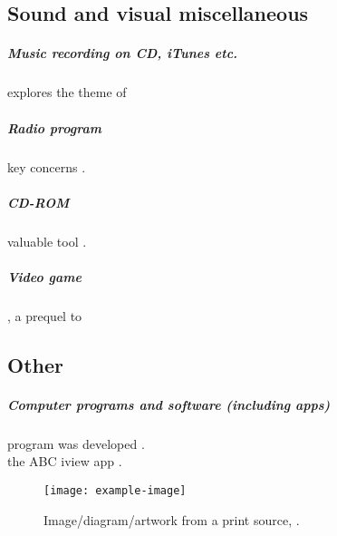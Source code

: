 \documentclass[a4paper,australian,oneside,12pt,footlines=3]{scrbook}%
\theoremstyle{remark}
\begin{document}
\begin{refsection}
\section{Sound and visual miscellaneous}
\paragraph{Music recording on CD, iTunes etc.}
\textcite{Palmer2011} explores the theme of\textelp{}

\paragraph{Radio program}
\textelp{}key concerns \parencite{ImmigrantNation}.

\paragraph{CD-ROM}
\textelp{}valuable tool \parencite{OxfordLearnersDict}.

\paragraph{Video game}
 \parencite{HaloReach}, a prequel to\textelp{}
\printbibliography[heading=subbibliography]
\end{refsection}

\begin{refsection}
\chapter{Other}
\paragraph{Computer programs and software (including apps)}
\textelp{} program was developed \parencite{matlab}.\\
\textelp{} the ABC iview app \parencite{ABCiViewApp}.

 
\begin{figure}[tbp]
\begin{center}
\texttt{[image: example-image]}
\end{center}
\caption{Image/diagram/artwork from a print source,  \parencite{HussinImage}.}
\end{figure}
\printbibliography[heading=subbibliography]
\end{refsection}
\end{document}
